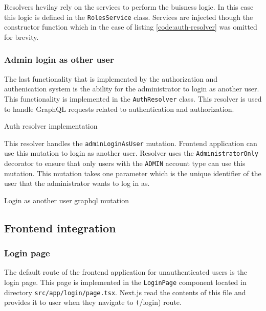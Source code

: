 \documentclass[../main.tex]{subfiles}
\begin{document}
Resolvers hevilay rely on the services to perform the buisness logic. In this case this logic is defined in the \texttt{RolesService} class.
Services are injected though the constructor function which in the case of listing \ref{code:auth-resolver} was omitted for brevity.


\subsubsection{Admin login as other user}

The last functionality that is implemented by the authorization and authenication system is the ability for the administrator to login as another user.
This functionality is implemented in the \texttt{AuthResolver} class. This resolver is used to handle GraphQL requests related to authentication and authorization.

\begin{listing}[H]
  \caption{Auth resolver implementation}
  \label{code:auth-resolver}
\end{listing}

This resolver handles the \texttt{adminLoginAsUser} mutation. Frontend application can use this mutation to login as another user.
Resolver uses the \texttt{AdministratorOnly} decorator to ensure that only users with the \texttt{ADMIN} account type can use this mutation.
This mutation takes one parameter which is the unique identifier of the user that the administrator wants to log in as.

\begin{listing}[H]
  \caption{Login as another user graphql mutation}
  \label{code:login-as-mutation}
\end{listing}

\subsection{Frontend integration}

\subsubsection{Login page}

The default route of the frontend application for unauthenticated users is the login page. This page is implemented in the \texttt{LoginPage} component
located in directory \texttt{src/app/login/page.tsx}. Next.js read the contents of this file and provides it to user when they navigate to \texttt(/login) route.
\end{document}
